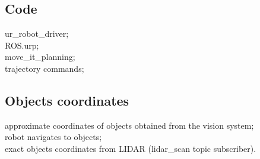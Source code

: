 \subsection{Code}
ur\_robot\_driver;\\
ROS.urp;\\
move\_it\_planning;\\
trajectory commands;\\

\subsection{Objects coordinates}
approximate coordinates of objects obtained from the vision system; \\
robot navigates to objects; \\
exact objects coordinates from LIDAR (lidar\_scan topic subscriber).\\










